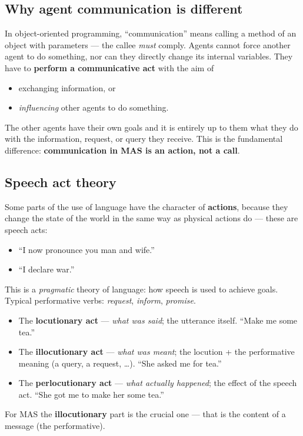 \documentclass[11pt,a4paper]{article}
\theoremstyle{definition}
\providecommand{\uv}[1]{``#1''}
\begin{document}
\subsection{Why agent communication is different}

In object-oriented programming, \uv{communication} means calling a method of an object with
parameters --- the callee \emph{must} comply. Agents cannot force another agent to do something, nor
can they directly change its internal variables. They have to \textbf{perform a communicative act}
with the aim of
\begin{itemize}
\item exchanging information, or
\item \emph{influencing} other agents to do something.
\end{itemize}
The other agents have their own goals and it is entirely up to them what they do with the information,
request, or query they receive. This is the fundamental difference: \textbf{communication in MAS is an
action, not a call}.

\subsection{Speech act theory}

\begin{defbox}
Some parts of the use of language have the character of \textbf{actions}, because they change the
state of the world in the same way as physical actions do --- these are speech acts:
\begin{itemize}
\item \uv{I now pronounce you man and wife.}
\item \uv{I declare war.}
\end{itemize}
This is a \emph{pragmatic} theory of language: how speech is used to achieve goals.
Typical performative verbs: \emph{request}, \emph{inform}, \emph{promise}.
\end{defbox}

\begin{defbox}
\begin{itemize}
\item The \textbf{locutionary act} --- \emph{what was said}; the utterance itself.
  \uv{Make me some tea.}
\item The \textbf{illocutionary act} --- \emph{what was meant};
  the locution + the performative meaning (a query, a request, \dots). \uv{She asked me for tea.}
\item The \textbf{perlocutionary act} --- \emph{what actually happened};
  the effect of the speech act. \uv{She got me to make her some tea.}
\end{itemize}
For MAS the \textbf{illocutionary} part is the crucial one --- that is the content of a message (the
performative).
\end{defbox}
\end{document}
